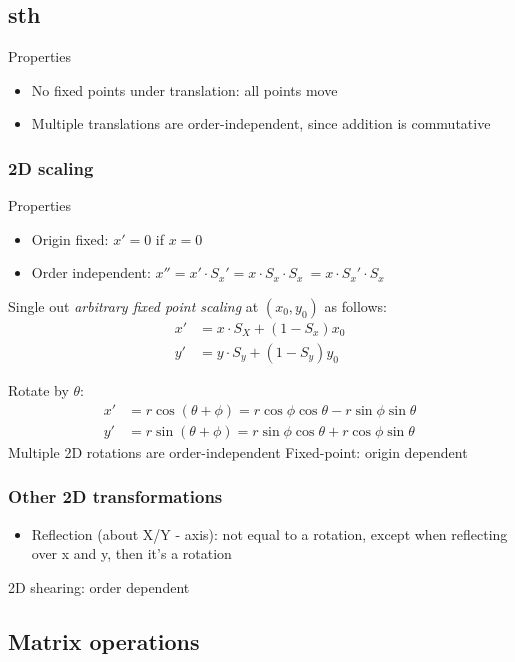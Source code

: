 \documentclass[11pt]{article}
\begin{document}
\subsection{sth} %
Properties
\begin{itemize}
    \item No fixed points under translation: all points move
    \item Multiple translations are order-independent, since addition is commutative 
\end{itemize}

\subsubsection{2D scaling}
Properties
\begin{itemize}
    \item Origin fixed: $x' = 0$ if $x=0$
    \item Order independent: $x'' = x' \cdot S_x' = x \cdot S_x \cdot S_x\  = x \cdot S_x' \cdot S_x$   
\end{itemize}
Single out \textit{arbitrary fixed point scaling} at $(x_0, y_0)$ as follows:
\begin{align*}
    x' &= x\cdot S_X + (1-S_x)x_0 \\
    y' &= y\cdot S_y  + (1-S_y)y_0
\end{align*} 

Rotate by $\theta$:
\begin{align*}
    x'&= r \cos (\theta + \phi) = r \cos \phi \cos \theta - r \sin \phi \sin \theta\\
    y' &= r \sin (\theta + \phi) = r \sin \phi \cos \theta + r \cos \phi \sin \theta
\end{align*} 
Multiple 2D rotations are order-independent
Fixed-point: origin dependent
\subsubsection{Other 2D transformations}
\begin{itemize}
    \item Reflection (about X/Y - axis): not equal to a rotation, except when reflecting over x and y, then it's a rotation
\end{itemize}
2D shearing: order dependent %

\subsection{Matrix operations} %
\end{document}
